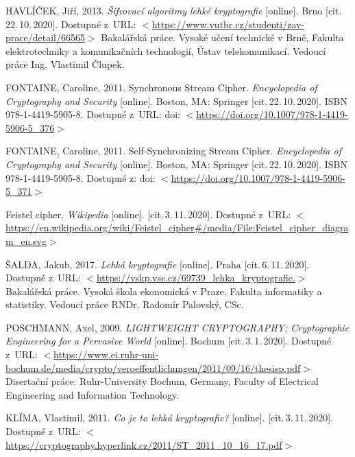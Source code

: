 \begin{thebibliography}{99}
    HAVLÍČEK, Jiří, 
    2013. 
    \emph{Šifrovací algoritmy lehké kryptografie} 
    [online]. 
    Brno 
    [cit.\,22.\,10.\,2020]. 
    Dostupné z~URL: \(<\)\url{https://www.vutbr.cz/studenti/zav-prace/detail/66565}\(>\)
    Bakalářská práce. 
    Vysoké učení technické v Brně, 
    Fakulta elektrotechniky a komunikačních technologií, 
    Ústav telekomunikací. 
    Vedoucí práce Ing. Vlastimil Člupek.
    
    \label{source:synchronous}
    FONTAINE, Caroline, 
    2011. 
    Synchronous Stream Cipher.
    \emph{Encyclopedia of Cryptography and Security} 
    [online]. 
    Boston, MA: Springer 
    [cit.\,22.\,10.\,2020]. 
    ISBN 978-1-4419-5905-8.
    Dostupné z~URL: doi: \(<\)\url{https://doi.org/10.1007/978-1-4419-5906-5_376}\(>\)
    
    \label{source:asynchronous}
    FONTAINE, Caroline, 
    2011. 
    Self-Synchronizing Stream Cipher. 
    \emph{Encyclopedia of Cryptography and Security} 
    [online]. 
    Boston, MA: Springer 
    [cit.\,22.\,10.\,2020].  
    ISBN 978-1-4419-5905-8. 
    Dostupné z: doi: \(<\)\url{https://doi.org/10.1007/978-1-4419-5906-5_371}\(>\)

    \label{source:FeistelCipher}
    Feistel cipher. 
    \emph{Wikipedia} 
    [online]. 
    [cit.\,3.\,11.\,2020].  
    Dostupné z~URL: \(<\)\url{https://en.wikipedia.org/wiki/Feistel_cipher#/media/File:Feistel_cipher_diagram_en.svg}\(>\)
    

    \label{SaldaBP}
    ŠALDA, Jakub, 
    2017. 
    \emph{Lehká kryptografie} 
    [online]. 
    Praha 
    [cit.\,6.\,11.\,2020]. 
    Dostupné z~URL: \(<\)\url{https://vskp.vse.cz/69739_lehka_kryptografie.}\(>\) 
    Bakalářská práce. 
    Vysoká škola ekonomická v Praze, Fakulta informatiky a statistiky. 
    Vedoucí práce RNDr. Radomír Palovský, CSc.
    

    \label{source:poschmannCrypto}
    POSCHMANN, Axel, 
    2009. 
    \emph{LIGHTWEIGHT CRYPTOGRAPHY: Cryptographic Engineering for a Pervasive World} 
    [online]. 
    Bochum 
    [cit.\,3.\,1.\,2020]. 
    Dostupné z~URL: \(<\)\url{https://www.ei.ruhr-uni-bochum.de/media/crypto/veroeffentlichungen/2011/09/16/thesisp.pdf}\(>\) 
    Disertační práce. 
    Ruhr-University Bochum, 
    Germany, 
    Faculty of Electrical Engineering and Information Technology.
    
    
    \label{klima}
    KLÍMA, Vlastimil, 
    2011. 
    \emph{Co je to lehká kryptografie?} 
    [online]. 
    [cit.\,3.\,11.\,2020].  
    Dostupné z~URL: \(<\)\url{https://cryptography.hyperlink.cz/2011/ST_2011_10_16_17.pdf}\(>\)


\end{thebibliography}
